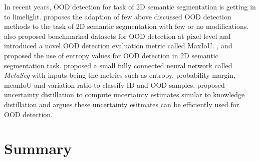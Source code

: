     In recent years, OOD detection for task of 2D semantic segmentation is getting in to limelight.
    \cite{pixel_OOD} proposes the adaption of few above discussed OOD detection methods to the task of 2D semantic segmentation with few or no modifications.
    \cite{pixel_OOD} also proposed benchmarked datasets for OOD detection at pixel level and introduced a novel OOD detection evaluation metric called MaxIoU.
    \cite{SemSeg_Entropy1}, and \cite{SemSeg_Entropy2} proposed the use of entropy values for OOD detection in 2D semantic segmentation task.
    \cite{MetaSeg} proposed a small fully connected neural network called \textit{MetaSeg} with inputs being the metrics such as entropy, probability margin, meanIoU and variation ratio to classify ID and OOD samples.
    \cite{uncertianty_distillation} proposed uncertainty distillation to compute uncertainty estimates similar to knowledge distillation and argues these uncertainty esitmates can be efficiently used for OOD detection.

    \section{Summary}
    


